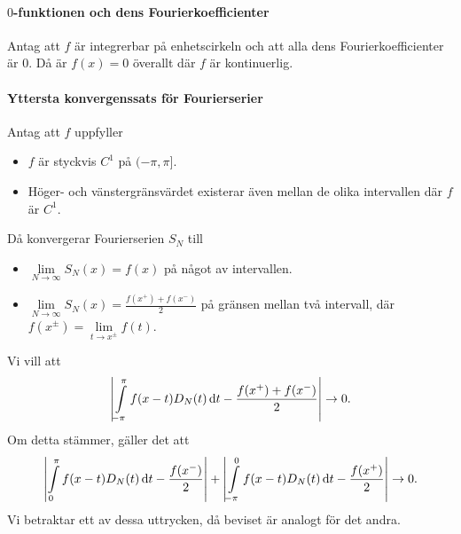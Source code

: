 \paragraph{$0$-funktionen och dens Fourierkoefficienter}
Antag att $f$ är integrerbar på enhetscirkeln och att alla dens Fourierkoefficienter är $0$. Då är $f(x) = 0$ överallt där $f$ är kontinuerlig.

\proof

\paragraph{Yttersta konvergenssats för Fourierserier}
Antag att $f$ uppfyller
\begin{itemize}
	\item $f$ är styckvis $C^{1}$ på $(-\pi, \pi]$.
	\item Höger- och vänstergränsvärdet existerar även mellan de olika intervallen där $f$ är $C^{1}$.
\end{itemize}
Då konvergerar Fourierserien $S_{N}$ till
\begin{itemize}
	\item $\lim\limits_{N\to\infty}S_{N}(x) = f(x)$ på något av intervallen.
	\item $\lim\limits_{N\to\infty}S_{N}(x) = \frac{f(x^{+}) + f(x^{-})}{2}$ på gränsen mellan två intervall, där $f(x^{\pm}) = \lim\limits_{t\to x^{\pm}}f(t)$.
\end{itemize}

\proof
Vi vill att
\begin{align*}
	\abs{\int\limits_{-\pi}^{\pi}f(x - t)D_{N}(t)\dd{t} - \frac{f(x^{+}) + f(x^{-})}{2}}\to 0.
\end{align*}
Om detta stämmer, gäller det att
\begin{align*}
	\abs{\int\limits_{0}^{\pi}f(x - t)D_{N}(t)\dd{t} - \frac{f(x^{-})}{2}} + \abs{\int\limits_{-\pi}^{0}f(x - t)D_{N}(t)\dd{t} - \frac{f(x^{+})}{2}} \to 0.
\end{align*}
Vi betraktar ett av dessa uttrycken, då beviset är analogt för det andra.

